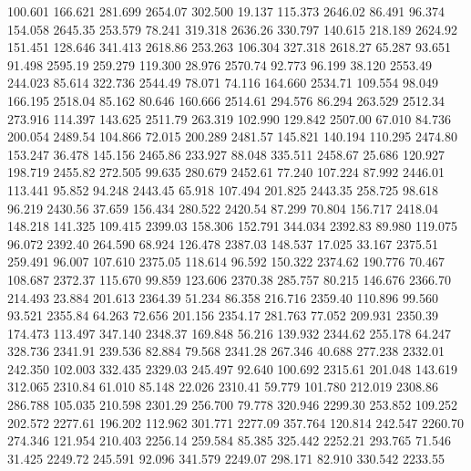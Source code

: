  100.601  166.621  281.699      2654.07
 302.500   19.137  115.373      2646.02
  86.491   96.374  154.058      2645.35
 253.579   78.241  319.318      2636.26
 330.797  140.615  218.189      2624.92
 151.451  128.646  341.413      2618.86
 253.263  106.304  327.318      2618.27
  65.287   93.651   91.498      2595.19
 259.279  119.300   28.976      2570.74
  92.773   96.199   38.120      2553.49
 244.023   85.614  322.736      2544.49
  78.071   74.116  164.660      2534.71
 109.554   98.049  166.195      2518.04
  85.162   80.646  160.666      2514.61
 294.576   86.294  263.529      2512.34
 273.916  114.397  143.625      2511.79
 263.319  102.990  129.842      2507.00
  67.010   84.736  200.054      2489.54
 104.866   72.015  200.289      2481.57
 145.821  140.194  110.295      2474.80
 153.247   36.478  145.156      2465.86
 233.927   88.048  335.511      2458.67
  25.686  120.927  198.719      2455.82
 272.505   99.635  280.679      2452.61
  77.240  107.224   87.992      2446.01
 113.441   95.852   94.248      2443.45
  65.918  107.494  201.825      2443.35
 258.725   98.618   96.219      2430.56
  37.659  156.434  280.522      2420.54
  87.299   70.804  156.717      2418.04
 148.218  141.325  109.415      2399.03
 158.306  152.791  344.034      2392.83
  89.980  119.075   96.072      2392.40
 264.590   68.924  126.478      2387.03
 148.537   17.025   33.167      2375.51
 259.491   96.007  107.610      2375.05
 118.614   96.592  150.322      2374.62
 190.776   70.467  108.687      2372.37
 115.670   99.859  123.606      2370.38
 285.757   80.215  146.676      2366.70
 214.493   23.884  201.613      2364.39
  51.234   86.358  216.716      2359.40
 110.896   99.560   93.521      2355.84
  64.263   72.656  201.156      2354.17
 281.763   77.052  209.931      2350.39
 174.473  113.497  347.140      2348.37
 169.848   56.216  139.932      2344.62
 255.178   64.247  328.736      2341.91
 239.536   82.884   79.568      2341.28
 267.346   40.688  277.238      2332.01
 242.350  102.003  332.435      2329.03
 245.497   92.640  100.692      2315.61
 201.048  143.619  312.065      2310.84
  61.010   85.148   22.026      2310.41
  59.779  101.780  212.019      2308.86
 286.788  105.035  210.598      2301.29
 256.700   79.778  320.946      2299.30
 253.852  109.252  202.572      2277.61
 196.202  112.962  301.771      2277.09
 357.764  120.814  242.547      2260.70
 274.346  121.954  210.403      2256.14
 259.584   85.385  325.442      2252.21
 293.765   71.546   31.425      2249.72
 245.591   92.096  341.579      2249.07
 298.171   82.910  330.542      2233.55
